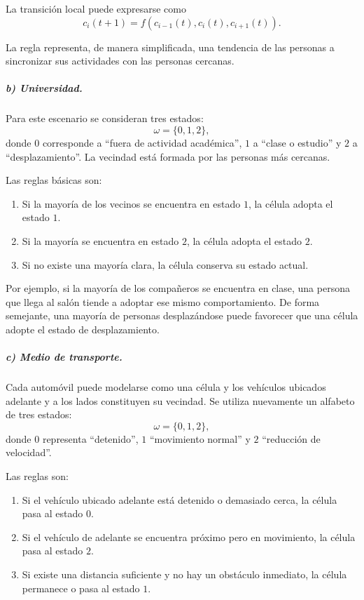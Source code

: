 \documentclass[14pt,twoside]{article}
\begin{document}
La transición local puede expresarse como
\[
c_i(t+1)=f\left(c_{i-1}(t),c_i(t),c_{i+1}(t)\right).
\]

La regla representa, de manera simplificada, una tendencia de las personas a
sincronizar sus actividades con las personas cercanas.

\subparagraph{b) Universidad.}

Para este escenario se consideran tres estados:
\[
\omega=\{0,1,2\},
\]
donde $0$ corresponde a ``fuera de actividad académica'', $1$ a ``clase o estudio''
y $2$ a ``desplazamiento''. La vecindad está formada por las personas más cercanas.

Las reglas básicas son:

\begin{enumerate}[label=\arabic*.]
    \item Si la mayoría de los vecinos se encuentra en estado $1$, la célula adopta
    el estado $1$.
    \item Si la mayoría se encuentra en estado $2$, la célula adopta el estado $2$.
    \item Si no existe una mayoría clara, la célula conserva su estado actual.
\end{enumerate}

Por ejemplo, si la mayoría de los compañeros se encuentra en clase, una persona que
llega al salón tiende a adoptar ese mismo comportamiento. De forma semejante, una
mayoría de personas desplazándose puede favorecer que una célula adopte el estado de
desplazamiento.

\subparagraph{c) Medio de transporte.}

Cada automóvil puede modelarse como una célula y los vehículos ubicados adelante y
a los lados constituyen su vecindad. Se utiliza nuevamente un alfabeto de tres estados:
\[
\omega=\{0,1,2\},
\]
donde $0$ representa ``detenido'', $1$ ``movimiento normal'' y $2$ ``reducción de
velocidad''.

Las reglas son:

\begin{enumerate}[label=\arabic*.]
    \item Si el vehículo ubicado adelante está detenido o demasiado cerca, la célula
    pasa al estado $0$.
    \item Si el vehículo de adelante se encuentra próximo pero en movimiento, la célula
    pasa al estado $2$.
    \item Si existe una distancia suficiente y no hay un obstáculo inmediato, la célula
    permanece o pasa al estado $1$.
\end{enumerate}
\end{document}
